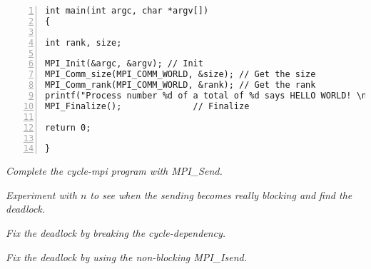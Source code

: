 \documentclass{article}
\begin{document}
\begin{lstlisting}[basicstyle=\small\sffamily,
keywords={break,case,const,continue,default,else,enum,
for,if,return,switch,while,do,long,void,int,float,double,
char,struct,typedef,include,size\_t},
keywordstyle={\color{blue}},
comment={[l]{//}}, morecomment={[s]{/*}{*/}}, commentstyle=\itshape,
columns={[l]flexible}, numbers=left, numberstyle=\tiny,
frameround=fftt, frame=shadowbox, captionpos=b,
caption={Your hello-world implementation.},
label=LST:hello]
int main(int argc, char *argv[])
{

int rank, size;

MPI_Init(&argc, &argv); // Init
MPI_Comm_size(MPI_COMM_WORLD, &size); // Get the size
MPI_Comm_rank(MPI_COMM_WORLD, &rank); // Get the rank
printf("Process number %d of a total of %d says HELLO WORLD! \n", rank+1, size); // Hello World
MPI_Finalize();              // Finalize

return 0;

}

\end{lstlisting}

\begin{ExerciseList}
\Exercise {}
  \Question \emph{Complete the cycle-mpi program with MPI\_Send.}

\Exercise
  \Question
  \emph{Experiment with $n$ to see when the sending
    becomes really blocking and find the deadlock.}

  \Question \emph{Fix the deadlock by breaking the cycle-dependency.}

  \Exercise
{}
  \Question \emph{Fix the deadlock by using the non-blocking MPI\_Isend.}

\end{ExerciseList}
\end{document}
